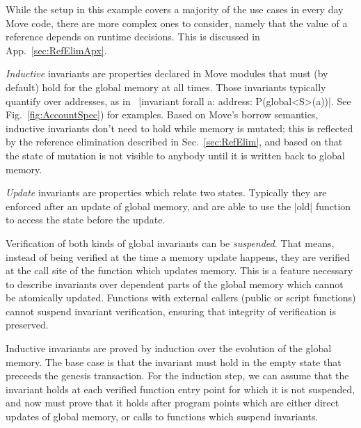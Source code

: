 While the setup in this example covers a majority of the use cases in every day
Move code, there are more complex ones to consider, namely that the value of a
reference depends on runtime decisions. This is discussed in App.~\ref{sec:RefElimApx}.


\label{sec:GlobalInvariants}



%

\emph{Inductive} invariants are properties declared in Move modules that must
(by default) hold for the global memory at all times. Those invariants typically
quantify over addresses, as in~%
|invariant forall a: address: P(global<S>(a))|. See Fig.~\ref{fig:AccountSpec})
for examples. Based on Move's borrow semantics, inductive invariants don't need
to hold while memory is mutated; this is reflected by the reference elimination
described in Sec.~\ref{sec:RefElim}, and based on that the state of mutation is
not visible to anybody until it is written back to global memory.

\emph{Update} invariants are properties which relate two states.  Typically they
are enforced after an update of global memory, and are able to use the |old|
function to access the state before the update.

Verification of both kinds of global invariants can be \emph{suspended}. That
means, instead of being verified at the time a memory update happens, they are
verified at the call site of the function which updates memory. This is a
feature necessary to describe invariants over dependent parts of the global
memory which cannot be atomically updated.  Functions with external callers
(public or script functions) cannot suspend invariant verification, ensuring
that integrity of verification is preserved.



Inductive invariants are proved by induction over the evolution of the global
memory. The base case is that the invariant must hold in the empty state that
preceeds the genesis transaction.  For the induction step, we can assume that
the invariant holds at each verified function entry point for which it is not
suspended, and now must prove that it holds after program points which are
either direct updates of global memory, or calls to functions which suspend
invariants.

